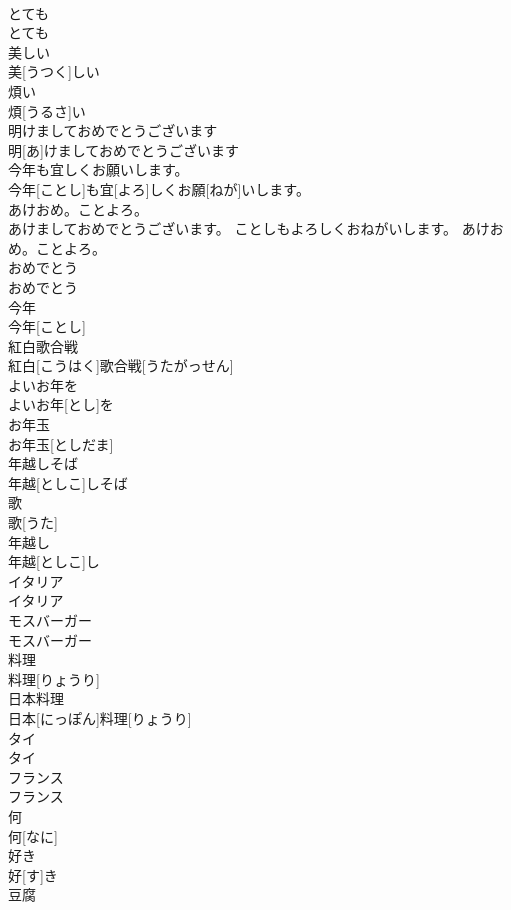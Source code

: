 \documentclass[8pt]{extreport}
\begin{document}
\begin{CJK}{UTF8}{min}
\\	とても	
\\	とても
\\	美しい	
\\	美[うつく]しい
\\	煩い	
\\	煩[うるさ]い
\\	明けましておめでとうございます	
\\	明[あ]けましておめでとうございます
\\	今年も宜しくお願いします。	
\\	今年[ことし]も宜[よろ]しくお願[ねが]いします。
\\	あけおめ。ことよろ。	
\\	あけましておめでとうございます。 ことしもよろしくおねがいします。	あけおめ。ことよろ。
\\	おめでとう	
\\	おめでとう
\\	今年	
\\	今年[ことし]
\\	紅白歌合戦	
\\	紅白[こうはく]歌合戦[うたがっせん]
\\	よいお年を	
\\	よいお年[とし]を
\\	お年玉	
\\	お年玉[としだま]
\\	年越しそば	
\\	年越[としこ]しそば
\\	歌	
\\	歌[うた]
\\	年越し	
\\	年越[としこ]し
\\	イタリア	
\\	イタリア
\\	モスバーガー	
\\	モスバーガー
\\	料理	
\\	料理[りょうり]
\\	日本料理	
\\	日本[にっぽん]料理[りょうり]
\\	タイ	
\\	タイ
\\	フランス	
\\	フランス
\\	何	
\\	何[なに]
\\	好き	
\\	好[す]き
\\	豆腐	

\end{CJK}
\end{document}
